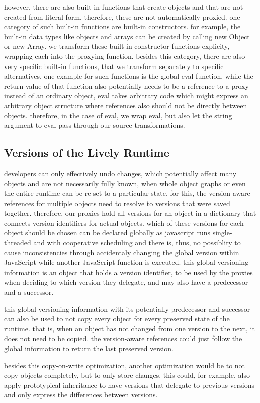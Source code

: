 however, there are also built-in functions that create objects and that are not created from literal form.
therefore, these are not automatically proxied.
one category of such built-in functions are built-in constructors.
for example, the built-in data types like objects and arrays can be created by calling new Object or new Array.
we transform these built-in constructor functions explicity, wrapping each into the proxying function.
besides this category, there are also very specific built-in functions, that we transform separately to specific alternatives.
one example for such functions is the global eval function.
while the return value of that function also potentially needs to be a reference to a proxy instead of an ordinary object, eval takes arbitrary code which might express an arbitrary object structure where references also should not be directly between objects.
therefore, in the case of eval, we wrap eval, but also let the string argument to eval pass through our source transformations.


\subsection{Versions of the Lively Runtime}

developers can only effectively undo changes, which potentially affect many objects and are not necessarily fully known, when whole object graphs or even the entire runtime can be re-set to a particular state.
for this, the version-aware references for multiple objects need to resolve to versions that were saved together.
therefore, our proxies hold all versions for an object in a dictionary that connects version identifiers for actual objects.
which of these versions for each object should be chosen can be declared globally as javascript runs single-threaded and with cooperative scheduling and there is, thus, no possiblity to cause inconsistencies through accidentaly changing the global version within JavaScript while another JavaScript function is executed.
this global versioning information is an object that holds a version identifier, to be used by the proxies when deciding to which version they delegate, and may also have a predecessor and a successor.

this global versioning information with its potentially predecessor and successor can also be used to not copy every object for every preserved state of the runtime.
that is, when an object has not changed from one version to the next, it does not need to be copied.
the version-aware references could just follow the global information to return the last preserved version.

besides this copy-on-write optimization, another optimization would be to not copy objects completely, but to only store changes.
this could, for example, also apply prototypical inheritance to have versions that delegate to previous versions and only express the differences between versions.